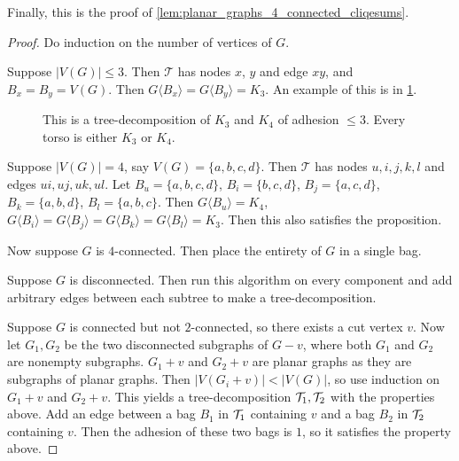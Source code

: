 Finally, this is the proof of \cref{lem:planar_graphs_4_connected_cliqesums}.
\begin{proof}
	Do induction on the number of vertices of $G$. 
	
	Suppose $|V(G)| \leq 3$. Then $\mathcal{T}$ has nodes $x$, $y$ and edge $xy$, and $B_x = B_y = V(G)$. Then $G \langle B_x \rangle = G \langle B_y \rangle = K_3$. An example of this is in \cref{fig:treedecomp_k4}. 

	\begin{figure}[h!]
		\centering
		
		\caption[Tree-decomposition of $K_4$]{This is a tree-decomposition of $K_3$ and $K_4$ of adhesion $\leq 3$. Every torso is either $K_3$ or $K_4$.}\label{fig:treedecomp_k4}
	\end{figure}
	
	Suppose $|V(G)| = 4$, say $V(G) = \{a,b,c,d\}$.  Then $\mathcal{T}$ has nodes $u, i,j,k,l$ and edges $ui, uj, uk, ul$. Let $B_u = \{a,b,c,d\}$, $B_i = \{b,c,d\}$, $B_j = \{a,c,d\}$, $B_k = \{a,b,d\}$, $B_l = \{a,b,c\}$. Then $G\langle B_u \rangle = K_4$, $G\langle B_i \rangle =G\langle B_j\rangle = G\langle B_k \rangle = G\langle B_l \rangle = K_3$. Then this also satisfies the proposition. 

	Now suppose $G$ is $4$-connected. Then place the entirety of $G$ in a single bag.

	Suppose $G$ is disconnected. Then run this algorithm on every component and add arbitrary edges between each subtree to make a tree-decomposition.

	Suppose $G$ is connected but not $2$-connected, so there exists a cut vertex $v$. Now let $G_1, G_2$ be the two disconnected subgraphs of $G - v$, where both $G_1$ and $G_2$ are nonempty subgraphs. $G_1 + v$ and $G_2 + v$ are planar graphs as they are subgraphs of planar graphs. Then $|V(G_i + v)| < |V(G)|$, so use induction on $G_1 + v$ and $G_2 + v$. This yields a tree-decomposition $\mathcal{T}_1, \mathcal{T}_2$ with the properties above. Add an edge between a bag $B_1$ in $\mathcal{T}_1$ containing $v$ and a bag $B_2$ in $\mathcal{T}_2$ containing $v$. Then the adhesion of these two bags is $1$, so it satisfies the property above. 


\end{proof}
